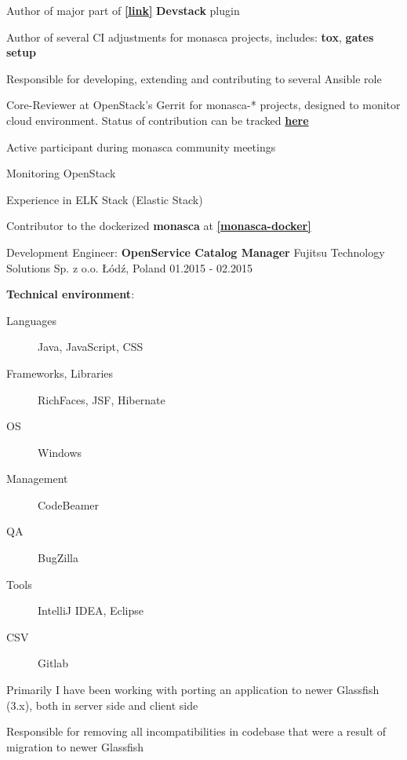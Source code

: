 \begin{cventries}
{\begin{cvitems}
      \item{Author of major part of
          \href{https://github.com/openstack/monasca-log-api}{\textbf{[\faGithubSquare\acvHeaderIconSep link]}} \textbf{Devstack} plugin}
      \item{Author of several CI adjustments for monasca projects, includes: \textbf{tox}, \textbf{gates setup}}
      \item{Responsible for developing, extending and contributing to several Ansible role}
      \item{Core-Reviewer at OpenStack’s Gerrit for monasca-* projects,
          designed to monitor cloud environment. Status of contribution can be tracked
          \href{http://stackalytics.com/?user_id=kornicameister&release=all&project_type=all&metric=person-day}{\textbf{here}}}
      \item{Active participant during monasca community meetings}
      \item{Monitoring OpenStack}
      \item{Experience in ELK Stack (Elastic Stack)}
      \item{Contributor to the dockerized \textbf{monasca} at \href{https://github.com/monasca/monasca-docker}{\textbf{[\faGithubSquare\acvHeaderIconSep monasca-docker]}}}
    \end{cvitems}
  }

  \cventry
  {Development Engineer: \textbf{OpenService Catalog Manager}}
  {Fujitsu Technology Solutions Sp. z o.o.}
  {Łódź, Poland}
  {01.2015 - 02.2015}
  {
    \begin{cvitems}
       \item[]{
            \textbf{Technical environment}:
            \begin{description}
                \item[Languages] Java, JavaScript, CSS
                \item[Frameworks, Libraries] RichFaces, JSF, Hibernate
                \item[OS] Windows
                \item[Management] CodeBeamer
                \item[QA] BugZilla
                \item[Tools] IntelliJ IDEA, Eclipse
                \item[CSV] \faGitlab\acvHeaderIconSep Gitlab
            \end{description}
       }
       \item{Primarily I have been working with porting an application
             to newer Glassfish (3.x), both
             in server side and client side}
       \item{Responsible for removing all incompatibilities in codebase that
             were a result of migration to newer Glassfish}
    \end{cvitems}
  }


\end{cventries}
